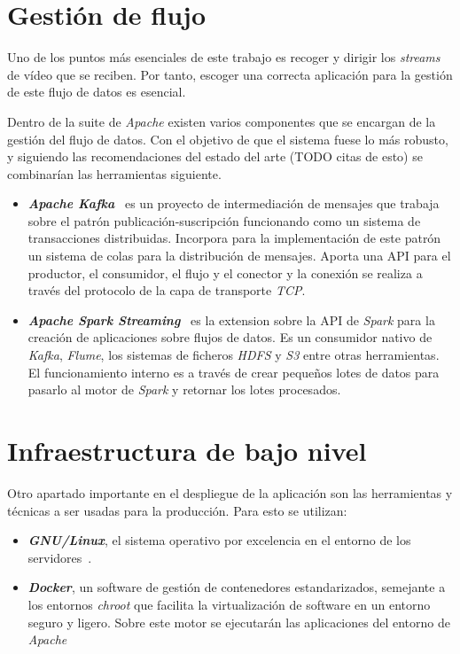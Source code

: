 
\section{Gestión de flujo}	

Uno de los puntos más esenciales de este trabajo es recoger y dirigir los \textit{streams} de vídeo que se reciben. Por tanto, escoger una correcta aplicación para la gestión de este flujo de datos es esencial.

Dentro de la suite de \textit{Apache} existen varios componentes que se encargan de la gestión del flujo de datos. Con el objetivo de que el sistema fuese lo más robusto, y siguiendo las recomendaciones del estado del arte (TODO citas de esto) se combinarían las herramientas siguiente.

\begin{itemize}
	\item \textit{\textbf{Apache Kafka}}~\cite{noauthorapachenodate} es un proyecto de intermediación de mensajes que trabaja sobre el patrón publicación-suscripción funcionando como un sistema de transacciones distribuidas. Incorpora para la implementación de este patrón un sistema de colas para la distribución de mensajes. Aporta una API para el productor, el consumidor, el flujo y el conector y la conexión se realiza a través del protocolo de la capa de transporte \textit{TCP}.  
	\item \textit{\textbf{Apache Spark Streaming}}~\cite{noauthorsparknodate} es la extension sobre la API de \textit{Spark} para la creación de aplicaciones sobre flujos de datos. Es un consumidor nativo de \textit{Kafka}, \textit{Flume}, los sistemas de ficheros \textit{HDFS} y \textit{S3} entre otras herramientas. El funcionamiento interno es a través de crear pequeños lotes de datos para pasarlo al motor de \textit{Spark} y retornar los lotes procesados.
\end{itemize}


\section{Infraestructura de bajo nivel}

Otro apartado importante en el despliegue de la aplicación son las herramientas y técnicas a ser usadas para la producción. Para esto se utilizan:

\begin{itemize}
	\item \textit{\textbf{GNU/Linux}}, el sistema operativo por excelencia en el entorno de los servidores~\cite{noauthorred2018, zhang2000linux}.
	\item \textit{\textbf{Docker}}, un software de gestión de contenedores estandarizados, semejante a los entornos \textit{chroot} que facilita la virtualización de software en un entorno seguro y ligero. Sobre este motor se ejecutarán las aplicaciones del entorno de \textit{Apache}~\cite{juez2019docker}
\end{itemize}
